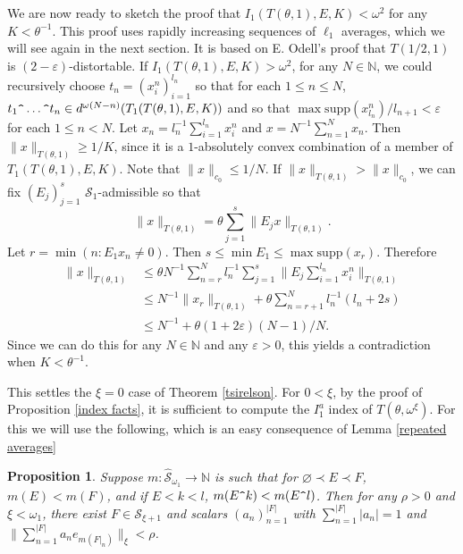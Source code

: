 \documentclass[12pt]{amsart}
\newtheorem{proposition}[theorem]{Proposition}
\theoremstyle{definition}
\newcommand{\nn}{\mathbb{N}}
\newcommand{\sss}{\mathcal{S}}
\newcommand{\supp}{\mathrm{supp}}
\begin{document}
We are now ready to sketch the proof that $I_1(T(\theta,1), E, K)<\omega^2$ for any $K<\theta^{-1}$.  This proof uses rapidly increasing sequences of $\ell_1$ averages, which we will see again in the next section. It is based on E. Odell's proof that $T(1/2, 1)$ is $(2-\varepsilon)$-distortable.   If $I_1(T(\theta,1), E, K)>\omega^2$, for any $N\in \nn$,  we could recursively choose $t_n=(x_i^n)_{i=1}^{l_n}$ so that for each $1\leqslant n\leqslant N$, $t_1\verb!^!\ldots \verb!^!t_n\in d^{\omega(N-n)}(T_1(T(\theta, 1), E, K))$ and so that $\max \supp(x_{l_n}^n)/l_{n+1}< \varepsilon$ for each $1\leqslant n<N$.  Let $x_n=l_n^{-1}\sum_{i=1}^{l_n} x_i^n$ and $x=N^{-1}\sum_{n=1}^N x_n$.  Then $\|x\|_{T(\theta, 1)}\geqslant 1/K$, since it is a $1$-absolutely convex combination of a member of $T_1(T(\theta, 1), E, K)$.  Note that $\|x\|_{c_0}\leqslant 1/N$.  If $\|x\|_{T(\theta, 1)}>\|x\|_{c_0}$, we can fix $(E_j)_{j=1}^s$ $\sss_1$-admissible so that $$\|x\|_{T(\theta, 1)}= \theta\sum_{j=1}^s \|E_jx\|_{T(\theta, 1)}.$$  Let $r=\min (n: E_1x_n\neq 0)$.  Then $s\leqslant \min E_1\leqslant \max \supp(x_r)$.  Therefore \begin{align*} \|x\|_{T(\theta, 1)} & \leqslant \theta N^{-1}\sum_{n=r}^N l_n^{-1}\sum_{j=1}^s \bigl\|E_j\sum_{i=1}^{l_n} x_i^n\bigr\|_{T(\theta, 1)} \\ & \leqslant N^{-1}\|x_r\|_{T(\theta, 1)}+\theta \sum_{n=r+1}^N l_n^{-1}(l_n + 2s) \\ & \leqslant N^{-1} + \theta(1+2\varepsilon) (N-1)/N. \end{align*} Since we can do this for any $N\in \nn$ and any $\varepsilon>0$, this yields a contradiction when $K<\theta^{-1}$.  

This settles the $\xi=0$ case of Theorem \ref{tsirelson}.  For $0<\xi$, by the proof of Proposition \ref{index facts}, it is sufficient to compute the $I^a_1$ index of $T(\theta, \omega^\xi)$.  For this we will use the following, which is an easy consequence of Lemma \ref{repeated averages}

\begin{proposition} Suppose $m:\widehat{\sss}_{\omega_1}\to \nn$ is such that for $\varnothing \prec E\prec F$, $m(E)<m(F)$, and if $E<k<l$, $m(E\verb!^!k)<m(E\verb!^!l)$.  Then for any $\rho>0$ and $\xi<\omega_1$, there exist $F\in \sss_{\xi+1}$ and scalars $(a_n)_{n=1}^{|F|}$ with $\sum_{n=1}^{|F|}|a_n|=1$ and $\|\sum_{n=1}^{|F|} a_n e_{m(F|_n)}\|_\xi< \rho$.  

\label{tsirelson thing}

\end{proposition}
\end{document}
